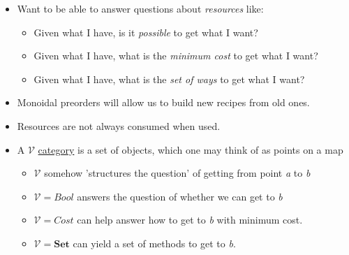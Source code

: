\begin{itemize}
    \item Want to be able to answer questions about \emph{resources} like:
          \begin{itemize}
            \item Given what I have, is it \emph{possible} to get what I want?
            \item Given what I have, what is the \emph{minimum cost} to get what I want?
            \item Given what I have, what is the \emph{set of ways} to get what I want?\end{itemize}
    \item Monoidal preorders will allow us to build new recipes from old ones.
    \item Resources are not always consumed when used.
    \item  A $\mathcal{V}$ \href{doc/1 math/Seven Sketches in Compositionality/Chapter 2: Resource theories/3 Enrichment/1 V-categories/1 V-category}{category} is a set of objects, which one may think of as points on a map
          \begin{itemize}
            \item  $\mathcal{V}$ somehow 'structures the question' of getting from point \emph{a} to \emph{b}
            \item  $\mathcal{V} = Bool$ answers the question of whether we can get to \emph{b}
            \item  $\mathcal{V} = Cost$ can help answer how to get to \emph{b} with minimum cost.
            \item  $\mathcal{V} = \mathbf{Set}$ can yield a set of methods to get to \emph{b}.\end{itemize}
  \end{itemize}
